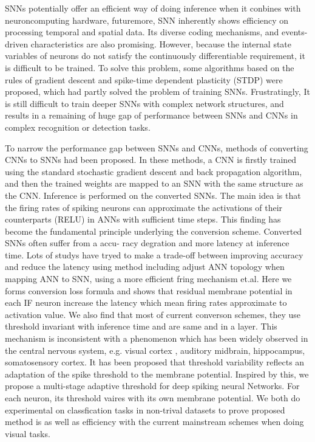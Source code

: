 \documentclass{article}
\begin{document}
SNNs potentially offer an efficient way of doing inference when it conbines with neuroncomputing hardware, futuremore, SNN inherently shows efficiency on processing temporal and spatial data. Its  
diverse coding mechanisms, and events-driven characteristics are also promising. However, because the internal state
variables of neurons do not satisfy the continuously differentiable
requirement, it is difficult to be trained. To solve this problem,
some algorithms based on the rules of gradient descent
and spike-time dependent plasticity (STDP) were proposed, which had partly solved the problem of training SNNs. 
Frustratingly, It is still difficult to train deeper SNNs with complex network 
structures, and results in a remaining of huge gap of
performance between SNNs and CNNs in complex recognition or detection tasks.

To narrow the performance gap between SNNs and CNNs, methods of converting CNNs to SNNs had been proposed. 
In these methods, a CNN is firstly trained using the standard stochastic gradient
descent and back propagation algorithm, and then the trained
weights are mapped to an SNN with the same structure as the
CNN. Inference is performed on the converted SNNs. The main idea is that the firing rates of spiking neurons can approximate the
activations of their counterparts (RELU) in ANNs  with sufficient time
steps. This finding has become the fundamental principle
underlying the conversion scheme. Converted SNNs often suffer from a accu-
racy degration and more latency at inference time. Lots of studys have tryed to
make a trade-off between improving accuracy and reduce the latency using method including adjust ANN topology when mapping ANN to SNN, using
a more efficient fring mechanism et.al. Here we forms conversion loss formula and shows that residual membrane potential in each IF neuron 
increase the latency which mean firing rates approximate to activation value. We also find that most of current converson schemes,
they use threshold invariant with inference time and are same and in a layer. This mechanism is inconsistent with a phenomenon which has been widely observed in 
the central nervous system, e.g. visual cortex , auditory 
midbrain, hippocampus, somatosensory cortex.  It has 
been proposed that threshold variability reflects 
an adaptation of the spike threshold to the membrane potential. Inspired by this, we propose a multi-stage adaptive threshold for deep spiking neural Networks. 
For each neuron, its threshold vaires with its own membrane potential. We both do experimental on classfication tasks in non-trival datasets to prove
proposed method is as well as efficiency with the current mainstream schemes when doing visual tasks.
\end{document}
